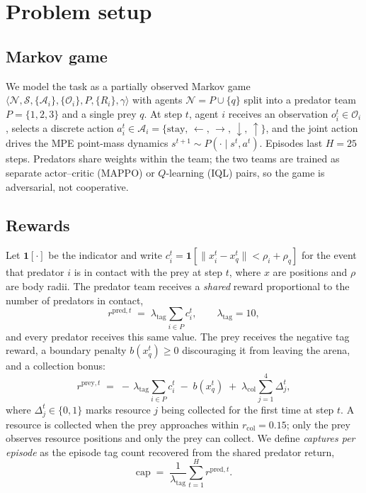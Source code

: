 \documentclass[11pt]{article}
\begin{document}
\section{Problem setup}

\subsection{Markov game}

We model the task as a partially observed Markov game
$\langle \mathcal{N}, \mathcal{S}, \{\mathcal{A}_i\}, \{\mathcal{O}_i\}, P, \{R_i\}, \gamma \rangle$
with agents $\mathcal{N} = P \cup \{q\}$ split into a predator team
$P = \{1,2,3\}$ and a single prey $q$. At step $t$, agent $i$ receives an
observation $o^t_i \in \mathcal{O}_i$, selects a discrete action
$a^t_i \in \mathcal{A}_i = \{\text{stay},\,\leftarrow,\,\rightarrow,\,\downarrow,\,\uparrow\}$,
and the joint action drives the MPE point-mass dynamics
$s^{t+1} \sim P(\cdot \mid s^t, a^t)$. Episodes last $H = 25$ steps. Predators
share weights within the team; the two teams are trained as separate
actor--critic (MAPPO) or $Q$-learning (IQL) pairs, so the game is adversarial,
not cooperative.

\subsection{Rewards}

Let $\mathbf{1}[\cdot]$ be the indicator and write $c^t_{i} = \mathbf{1}\!\left[
\lVert x^t_i - x^t_q \rVert < \rho_i + \rho_q \right]$ for the event that
predator $i$ is in contact with the prey at step $t$, where $x$ are positions and
$\rho$ are body radii. The predator team receives a \emph{shared} reward
proportional to the number of predators in contact,
\begin{equation}
  r^{\mathrm{pred},t} \;=\; \lambda_{\mathrm{tag}} \sum_{i \in P} c^t_i,
  \qquad \lambda_{\mathrm{tag}} = 10,
  \label{eq:rpred}
\end{equation}
and every predator receives this same value. The prey receives the negative tag
reward, a boundary penalty $b(x^t_q) \geq 0$ discouraging it from leaving the
arena, and a collection bonus:
\begin{equation}
  r^{\mathrm{prey},t} \;=\; -\,\lambda_{\mathrm{tag}} \sum_{i \in P} c^t_i
  \;-\; b(x^t_q)
  \;+\; \lambda_{\mathrm{col}} \sum_{j=1}^{4} \Delta^t_j,
  \label{eq:rprey}
\end{equation}
where $\Delta^t_j \in \{0,1\}$ marks resource $j$ being collected for the first
time at step $t$. A resource is collected when the prey approaches within
$r_{\mathrm{col}} = 0.15$; only the prey observes resource positions and only the
prey can collect. We define \emph{captures per episode} as the episode tag count
recovered from the shared predator return,
\begin{equation}
  \mathrm{cap} \;=\; \frac{1}{\lambda_{\mathrm{tag}}}
  \sum_{t=1}^{H} r^{\mathrm{pred},t}.
  \label{eq:captures}
\end{equation}
\end{document}
